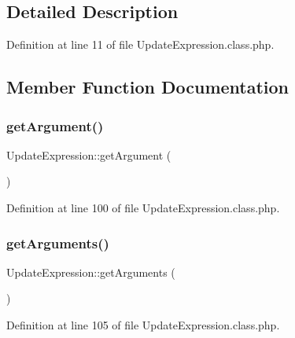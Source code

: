 \subsection{Detailed Description}


Definition at line 11 of file Update\+Expression.\+class.\+php.



\subsection{Member Function Documentation}
\hypertarget{classUpdateExpression_a86d860d80b3053bd4bcff511160aca3b}{}\label{classUpdateExpression_a86d860d80b3053bd4bcff511160aca3b} 
\subsubsection{\texorpdfstring{get\+Argument()}{getArgument()}}
{\footnotesize\ttfamily Update\+Expression\+::get\+Argument (\begin{DoxyParamCaption}{ }\end{DoxyParamCaption})}



Definition at line 100 of file Update\+Expression.\+class.\+php.

\hypertarget{classUpdateExpression_a898b47f8e6a8191fd75143d402884b02}{}\label{classUpdateExpression_a898b47f8e6a8191fd75143d402884b02} 
\subsubsection{\texorpdfstring{get\+Arguments()}{getArguments()}}
{\footnotesize\ttfamily Update\+Expression\+::get\+Arguments (\begin{DoxyParamCaption}{ }\end{DoxyParamCaption})}



Definition at line 105 of file Update\+Expression.\+class.\+php.

\hypertarget{classUpdateExpression_a1824b01ff4d35cec7d284fcd192d1c58}{}\label{classUpdateExpression_a1824b01ff4d35cec7d284fcd192d1c58} 
